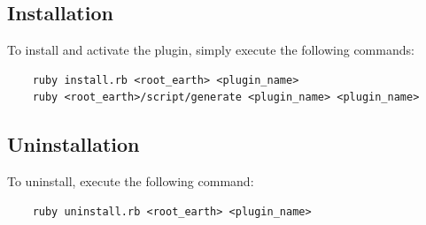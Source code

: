 \documentclass{article}
\begin{document}

\subsection{Installation} %

To install and activate the plugin, simply execute the following commands:

\begin{verbatim}
    ruby install.rb <root_earth> <plugin_name>
    ruby <root_earth>/script/generate <plugin_name> <plugin_name>
\end{verbatim}


\subsection{Uninstallation} %

To uninstall, execute the following command:

\begin{verbatim}
    ruby uninstall.rb <root_earth> <plugin_name>
\end{verbatim}

\end{document}
